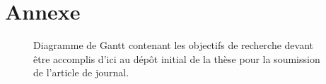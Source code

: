 \section{Annexe}
\label{sec:Annexe}

\setlength{\fboxsep}{9pt}
\begin{figure}[htbp]
  \centering
  
  \caption{Diagramme de Gantt contenant les objectifs de recherche devant être accomplis d'ici au dépôt initial de la thèse pour la soumission de l'article de journal.
  }
  \label{fig:gantt_recherche}
\end{figure}
\setlength{\fboxsep}{12pt}